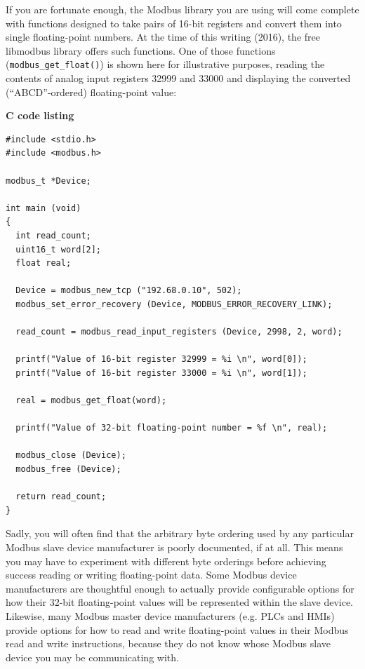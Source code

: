 \vskip 10pt

If you are fortunate enough, the Modbus library you are using will come complete with functions designed to take pairs of 16-bit registers and convert them into single floating-point numbers.  At the time of this writing (2016), the free libmodbus library offers such functions.  One of those functions (\texttt{modbus\_get\_float()}) is shown here for illustrative purposes, reading the contents of analog input registers 32999 and 33000 and displaying the converted (``ABCD''-ordered) floating-point value:

\vskip 10pt

\textbf{C code listing} 

\lstset{language=C}
\begin{lstlisting}
#include <stdio.h>
#include <modbus.h>

modbus_t *Device;

int main (void)
{
  int read_count;
  uint16_t word[2];
  float real;

  Device = modbus_new_tcp ("192.68.0.10", 502);
  modbus_set_error_recovery (Device, MODBUS_ERROR_RECOVERY_LINK);

  read_count = modbus_read_input_registers (Device, 2998, 2, word);

  printf("Value of 16-bit register 32999 = %i \n", word[0]);
  printf("Value of 16-bit register 33000 = %i \n", word[1]);

  real = modbus_get_float(word);

  printf("Value of 32-bit floating-point number = %f \n", real);
  
  modbus_close (Device);
  modbus_free (Device);

  return read_count;
}
\end{lstlisting}

\vskip 10pt

Sadly, you will often find that the arbitrary byte ordering used by any particular Modbus slave device manufacturer is poorly documented, if at all.  This means you may have to experiment with different byte orderings before achieving success reading or writing floating-point data.  Some Modbus device manufacturers are thoughtful enough to actually provide configurable options for how their 32-bit floating-point values will be represented within the slave device.  Likewise, many Modbus master device manufacturers (e.g. PLCs and HMIs) provide options for how to read and write floating-point values in their Modbus read and write instructions, because they do not know whose Modbus slave device you may be communicating with.











